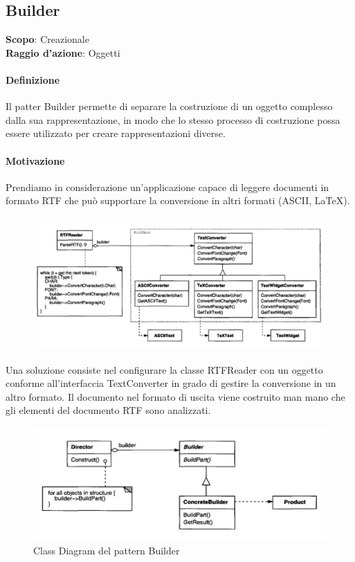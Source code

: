 \subsection{Builder}
\label{builder}

\textbf{Scopo}: Creazionale \\
\textbf{Raggio d'azione}: Oggetti

\paragraph{Definizione} Il patter Builder permette di separare la costruzione di un oggetto complesso dalla sua rappresentazione, in modo che lo stesso processo di costruzione possa essere utilizzato per creare rappresentazioni diverse.

\paragraph{Motivazione} Prendiamo in considerazione un’applicazione capace di leggere documenti in formato RTF che può supportare la conversione in altri formati (ASCII, LaTeX).

\begin{figure}[H]
    \centering
    \includegraphics[width=0.75\linewidth]{assets/pattern/builder/builder-esempio.png}
\end{figure}

Una soluzione consiste nel configurare la classe RTFReader con un oggetto conforme all’interfaccia TextConverter in grado di gestire la conversione in un altro formato. Il documento nel formato di uscita viene costruito man mano che gli elementi del documento RTF sono analizzati.

\begin{figure}[H]
    \centering
    \includegraphics[width=0.75\linewidth]{assets/pattern/builder/builder-struttura.png}
    \caption{Class Diagram del pattern Builder}
\end{figure}

